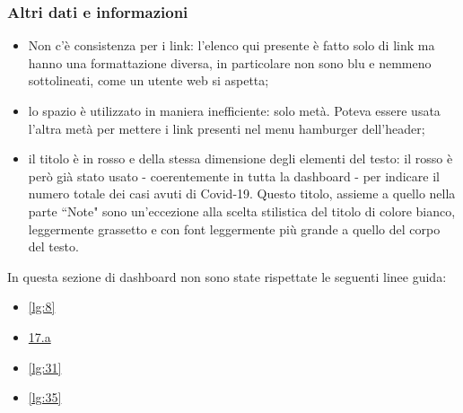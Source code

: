 \subsubsection{Altri dati e informazioni}
\label{sss:altri-dati-informazioni}
\begin{itemize}
    \item Non c'è consistenza per i link: l'elenco qui presente è fatto solo di link ma hanno una formattazione diversa, in particolare non sono blu e nemmeno sottolineati, come un utente web si aspetta;
    \item lo spazio è utilizzato in maniera inefficiente: solo metà. Poteva essere usata l'altra metà per mettere i link presenti nel menu hamburger dell'header;
    \item il titolo è in rosso e della stessa dimensione degli elementi del testo: il rosso è però già stato usato - coerentemente in tutta la dashboard - per indicare il numero totale dei casi avuti di Covid-19. Questo titolo, assieme a quello nella parte ``Note" sono un'eccezione alla scelta stilistica del titolo di colore bianco, leggermente grassetto e con font leggermente più grande a quello del corpo del testo.
\end{itemize}
In questa sezione di dashboard non sono state rispettate le seguenti linee guida:
\begin{itemize}
    \item \ref{lg:8}
    \item \hyperref[lg:17.a]{17.a}
    \item \ref{lg:31}
    \item \ref{lg:35}
\end{itemize}


